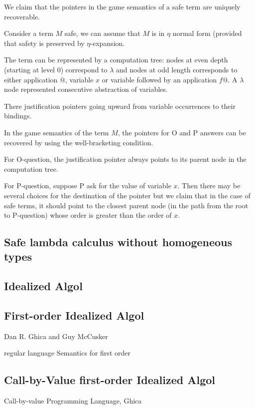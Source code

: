 \documentclass{article}
\begin{document}
We claim that the pointers in the game semantics of a safe term are uniquely recoverable.

Consider a term $M$ safe, we can assume that $M$ is in $\eta$ normal form (provided that safety is preserved by $\eta$-expansion.

The term can be represented by a computation tree: nodes at even depth (starting at level 0) correspond to $\lambda$ and
nodes at odd length corresponds to either application $@$, variable $x$ or variable followed by an application $f@$.
A $\lambda$ node represented consecutive abstraction of variables.

There justification pointers going upward from variable occurrences to their bindings.

In the game semantics of the term $M$, the pointers for O and P answers can be recovered by using the well-bracketing condition.

For O-question, the justification pointer always points to its parent node in the computation tree.

For P-question, suppose P ask for the value of variable $x$. Then there may be several choices for the
destination of the pointer but we claim that in the case of safe terms, it should point
to the closest parent node (in the path from the root to P-question) whose order is greater than the order of $x$.

\subsection{Safe lambda calculus without homogeneous types}


\subsection{Idealized Algol}

\subsection{First-order Idealized Algol}

Dan R. Ghica and Guy McCusker

 regular language Semantics for first order

\subsection{Call-by-Value first-order Idealized Algol}

Call-by-value Programming Language, Ghica







\end{document}
